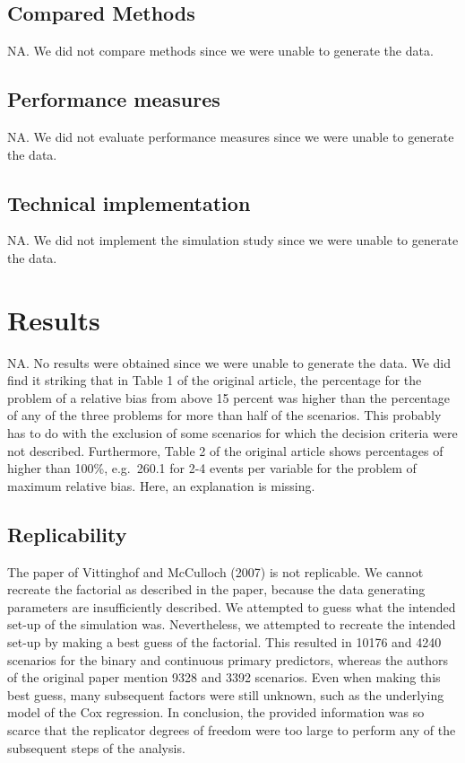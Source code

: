\documentclass[10,a4paperpaper,]{article}
\begin{document}
\subsection{Compared Methods}

NA. We did not compare methods since we were unable to generate the
data.

\subsection{Performance measures}

NA. We did not evaluate performance measures since we were unable to
generate the data.

\subsection{Technical implementation}

NA. We did not implement the simulation study since we were unable to
generate the data.

\section{Results}

NA. No results were obtained since we were unable to generate the data.
We did find it striking that in Table 1 of the original article, the
percentage for the problem of a relative bias from above 15 percent was
higher than the percentage of any of the three problems for more than
half of the scenarios. This probably has to do with the exclusion of
some scenarios for which the decision criteria were not described.
Furthermore, Table 2 of the original article shows percentages of higher
than 100\%, e.g.~260.1 for 2-4 events per variable for the problem of
maximum relative bias. Here, an explanation is missing.

\subsection{Replicability}

The paper of Vittinghof and McCulloch (2007) is not replicable. We
cannot recreate the factorial as described in the paper, because the
data generating parameters are insufficiently described. We attempted to
guess what the intended set-up of the simulation was. Nevertheless, we
attempted to recreate the intended set-up by making a best guess of the
factorial. This resulted in 10176 and 4240 scenarios for the binary and
continuous primary predictors, whereas the authors of the original paper
mention 9328 and 3392 scenarios. Even when making this best guess, many
subsequent factors were still unknown, such as the underlying model of
the Cox regression. In conclusion, the provided information was so
scarce that the replicator degrees of freedom were too large to perform
any of the subsequent steps of the analysis.
\end{document}
